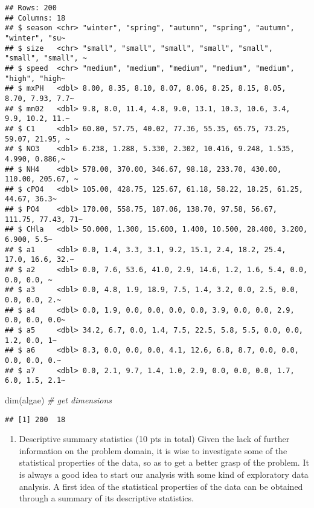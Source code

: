 \documentclass[
]{article}
\newenvironment{Shaded}{\begin{snugshade}}{\end{snugshade}}
\newcommand{\CommentTok}[1]{\textcolor[rgb]{0.56,0.35,0.01}{\textit{#1}}}
\newcommand{\FunctionTok}[1]{\textcolor[rgb]{0.00,0.00,0.00}{#1}}
\newcommand{\NormalTok}[1]{#1}
\providecommand{\tightlist}{%
  \setlength{\itemsep}{0pt}\setlength{\parskip}{0pt}}
\begin{document}
\begin{verbatim}
## Rows: 200
## Columns: 18
## $ season <chr> "winter", "spring", "autumn", "spring", "autumn", "winter", "su~
## $ size   <chr> "small", "small", "small", "small", "small", "small", "small", ~
## $ speed  <chr> "medium", "medium", "medium", "medium", "medium", "high", "high~
## $ mxPH   <dbl> 8.00, 8.35, 8.10, 8.07, 8.06, 8.25, 8.15, 8.05, 8.70, 7.93, 7.7~
## $ mn02   <dbl> 9.8, 8.0, 11.4, 4.8, 9.0, 13.1, 10.3, 10.6, 3.4, 9.9, 10.2, 11.~
## $ C1     <dbl> 60.80, 57.75, 40.02, 77.36, 55.35, 65.75, 73.25, 59.07, 21.95, ~
## $ NO3    <dbl> 6.238, 1.288, 5.330, 2.302, 10.416, 9.248, 1.535, 4.990, 0.886,~
## $ NH4    <dbl> 578.00, 370.00, 346.67, 98.18, 233.70, 430.00, 110.00, 205.67, ~
## $ cPO4   <dbl> 105.00, 428.75, 125.67, 61.18, 58.22, 18.25, 61.25, 44.67, 36.3~
## $ PO4    <dbl> 170.00, 558.75, 187.06, 138.70, 97.58, 56.67, 111.75, 77.43, 71~
## $ CHla   <dbl> 50.000, 1.300, 15.600, 1.400, 10.500, 28.400, 3.200, 6.900, 5.5~
## $ a1     <dbl> 0.0, 1.4, 3.3, 3.1, 9.2, 15.1, 2.4, 18.2, 25.4, 17.0, 16.6, 32.~
## $ a2     <dbl> 0.0, 7.6, 53.6, 41.0, 2.9, 14.6, 1.2, 1.6, 5.4, 0.0, 0.0, 0.0, ~
## $ a3     <dbl> 0.0, 4.8, 1.9, 18.9, 7.5, 1.4, 3.2, 0.0, 2.5, 0.0, 0.0, 0.0, 2.~
## $ a4     <dbl> 0.0, 1.9, 0.0, 0.0, 0.0, 0.0, 3.9, 0.0, 0.0, 2.9, 0.0, 0.0, 0.0~
## $ a5     <dbl> 34.2, 6.7, 0.0, 1.4, 7.5, 22.5, 5.8, 5.5, 0.0, 0.0, 1.2, 0.0, 1~
## $ a6     <dbl> 8.3, 0.0, 0.0, 0.0, 4.1, 12.6, 6.8, 8.7, 0.0, 0.0, 0.0, 0.0, 0.~
## $ a7     <dbl> 0.0, 2.1, 9.7, 1.4, 1.0, 2.9, 0.0, 0.0, 0.0, 1.7, 6.0, 1.5, 2.1~
\end{verbatim}

\begin{Shaded}
\begin{Highlighting}[]
\FunctionTok{dim}\NormalTok{(algae) }\CommentTok{\# get dimensions}
\end{Highlighting}
\end{Shaded}

\begin{verbatim}
## [1] 200  18
\end{verbatim}

\begin{enumerate}
\def\labelenumi{\arabic{enumi}.}
\tightlist
\item
  Descriptive summary statistics (10 pts in total) Given the lack of
  further information on the problem domain, it is wise to investigate
  some of the statistical properties of the data, so as to get a better
  grasp of the problem. It is always a good idea to start our analysis
  with some kind of exploratory data analysis. A first idea of the
  statistical properties of the data can be obtained through a summary
  of its descriptive statistics.
\end{enumerate}
\end{document}
